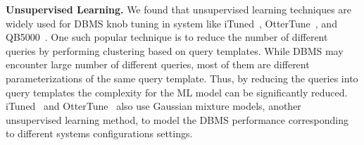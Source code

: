 \vspace{2mm}
\noindent \textbf{Unsupervised Learning.} We found that unsupervised learning techniques are widely used for DBMS knob tuning in system like iTuned~\cite{ituned}, OtterTune~\cite{ottertune}, and QB5000~\cite{qb5000}.
One such popular technique is to reduce the number of different queries by performing clustering based on query templates.
While DBMS may encounter large number of different queries, most of them are different parameterizations of the same query template.
Thus, by reducing the queries into query templates the complexity for the ML model can be significantly reduced.
iTuned~\cite{ituned} and OtterTune~\cite{ottertune} also use Gaussian mixture models, another unsupervised learning method, to model the DBMS performance corresponding to different systems configurations settings.
